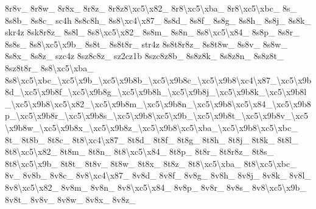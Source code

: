 \begin{DoxyCompactItemize}
8r8v\-\_\- 8r8w\-\_\- 8r8x\-\_\- 8r8z\-\_\- 8r8z8\textbackslash{}xc5\textbackslash{}x82\-\_\- 8r8\textbackslash{}xc5\textbackslash{}xba\-\_\- 8r8\textbackslash{}xc5\textbackslash{}xbc\-\_\- 8s\-\_\- 8s8b\-\_\- 8s8c\-\_\- sc4h 8s8c8h\-\_\- 8s8\textbackslash{}xc4\textbackslash{}x87\-\_\- 8s8d\-\_\- 8s8f\-\_\- 8s8g\-\_\- 8s8h\-\_\- 8s8j\-\_\- 8s8k\-\_\- skr4z 8sk8r8z\-\_\- 8s8l\-\_\- 8s8\textbackslash{}xc5\textbackslash{}x82\-\_\- 8s8m\-\_\- 8s8n\-\_\- 8s8\textbackslash{}xc5\textbackslash{}x84\-\_\- 8s8p\-\_\- 8s8r\-\_\- 8s8s\-\_\- 8s8\textbackslash{}xc5\textbackslash{}x9b\-\_\- 8s8t\-\_\- 8s8t8r\-\_\- str4z 8s8t8r8z\-\_\- 8s8t8w\-\_\- 8s8v\-\_\- 8s8w\-\_\- 8s8x\-\_\- 8s8z\-\_\- szc4z 8sz8c8z\-\_\- sz2cz1b 8szc8z8b\-\_\- 8s8z8k\-\_\- 8s8z8n\-\_\- 8s8z8t\-\_\- 8sz8t8r\-\_\- 8s8\textbackslash{}xc5\textbackslash{}xba\-\_\- 8s8\textbackslash{}xc5\textbackslash{}xbc\-\_\textbackslash{}xc5\textbackslash{}x9b\-\_\textbackslash{}xc5\textbackslash{}x9b8b\-\_\textbackslash{}xc5\textbackslash{}x9b8c\-\_\textbackslash{}xc5\textbackslash{}x9b8\textbackslash{}xc4\textbackslash{}x87\-\_\textbackslash{}xc5\textbackslash{}x9b8d\-\_\textbackslash{}xc5\textbackslash{}x9b8f\-\_\textbackslash{}xc5\textbackslash{}x9b8g\-\_\textbackslash{}xc5\textbackslash{}x9b8h\-\_\textbackslash{}xc5\textbackslash{}x9b8j\-\_\textbackslash{}xc5\textbackslash{}x9b8k\-\_\textbackslash{}xc5\textbackslash{}x9b8l\-\_\textbackslash{}xc5\textbackslash{}x9b8\textbackslash{}xc5\textbackslash{}x82\-\_\textbackslash{}xc5\textbackslash{}x9b8m\-\_\textbackslash{}xc5\textbackslash{}x9b8n\-\_\textbackslash{}xc5\textbackslash{}x9b8\textbackslash{}xc5\textbackslash{}x84\-\_\textbackslash{}xc5\textbackslash{}x9b8p\-\_\textbackslash{}xc5\textbackslash{}x9b8r\-\_\textbackslash{}xc5\textbackslash{}x9b8s\-\_\textbackslash{}xc5\textbackslash{}x9b8\textbackslash{}xc5\textbackslash{}x9b\-\_\textbackslash{}xc5\textbackslash{}x9b8t\-\_\textbackslash{}xc5\textbackslash{}x9b8v\-\_\textbackslash{}xc5\textbackslash{}x9b8w\-\_\textbackslash{}xc5\textbackslash{}x9b8x\-\_\textbackslash{}xc5\textbackslash{}x9b8z\-\_\textbackslash{}xc5\textbackslash{}x9b8\textbackslash{}xc5\textbackslash{}xba\-\_\textbackslash{}xc5\textbackslash{}x9b8\textbackslash{}xc5\textbackslash{}xbc\-\_\- 8t\-\_\- 8t8b\-\_\- 8t8c\-\_\- 8t8\textbackslash{}xc4\textbackslash{}x87\-\_\- 8t8d\-\_\- 8t8f\-\_\- 8t8g\-\_\- 8t8h\-\_\- 8t8j\-\_\- 8t8k\-\_\- 8t8l\-\_\- 8t8\textbackslash{}xc5\textbackslash{}x82\-\_\- 8t8m\-\_\- 8t8n\-\_\- 8t8\textbackslash{}xc5\textbackslash{}x84\-\_\- 8t8p\-\_\- 8t8r\-\_\- 8t8r8z\-\_\- 8t8s\-\_\- 8t8\textbackslash{}xc5\textbackslash{}x9b\-\_\- 8t8t\-\_\- 8t8v\-\_\- 8t8w\-\_\- 8t8x\-\_\- 8t8z\-\_\- 8t8\textbackslash{}xc5\textbackslash{}xba\-\_\- 8t8\textbackslash{}xc5\textbackslash{}xbc\-\_\- 8v\-\_\- 8v8b\-\_\- 8v8c\-\_\- 8v8\textbackslash{}xc4\textbackslash{}x87\-\_\- 8v8d\-\_\- 8v8f\-\_\- 8v8g\-\_\- 8v8h\-\_\- 8v8j\-\_\- 8v8k\-\_\- 8v8l\-\_\- 8v8\textbackslash{}xc5\textbackslash{}x82\-\_\- 8v8m\-\_\- 8v8n\-\_\- 8v8\textbackslash{}xc5\textbackslash{}x84\-\_\- 8v8p\-\_\- 8v8r\-\_\- 8v8s\-\_\- 8v8\textbackslash{}xc5\textbackslash{}x9b\-\_\- 8v8t\-\_\- 8v8v\-\_\- 8v8w\-\_\- 8v8x\-\_\- 8v8z\-\_\- 
\end{DoxyCompactItemize}
